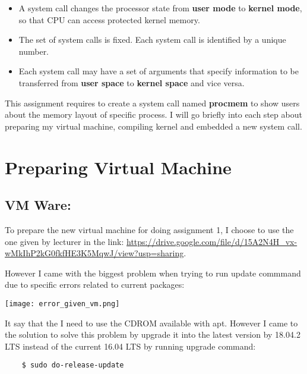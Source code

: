 \documentclass[a4paper, 11pt]{article}
\begin{document}
\begin{itemize}
    \item A system call changes the processor state from \textbf{user mode} to \textbf{kernel mode}, so that CPU can access protected kernel memory.
    \item The set of system calls is fixed. Each system call is identified by a unique number.
    \item Each system call may have a set of arguments that specify information to be transferred from \textbf{user space} to \textbf{kernel space} and vice versa.
\end{itemize}

\bigbreak

\par{This assignment requires to create a system call named \textbf{procmem} to show users about the memory layout of specific process. I will go briefly into each step about preparing my virtual machine, compiling kernel and embedded a new system call.}

\newpage
\section{Preparing Virtual Machine}
\subsection{VM Ware:}

\par{To prepare the new virtual machine for doing assignment 1, I choose to use the one given by lecturer in the link: \url{https://drive.google.com/file/d/15A2N4H_vx-wMkIhP2kG0fkfHE3K5MqwJ/view?usp=sharing}.}

\par{However I came with the biggest problem when trying to run update commmand due to specific errors related to current packages:}

\bigbreak
\texttt{[image: error\_given\_vm.png]}
\bigbreak

\par{It say that the I need to use the CDROM available with apt. However I came to the solution to solve this problem by upgrade it into the latest version by 18.04.2 LTS instead of the current 16.04 LTS by running upgrade command:}

\begin{verbatim}
    $ sudo do-release-update
\end{verbatim}
\end{document}
